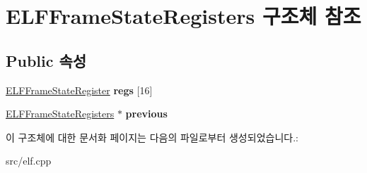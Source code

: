 \hypertarget{struct_e_l_f_frame_state_registers}{}\section{E\+L\+F\+Frame\+State\+Registers 구조체 참조}
\label{struct_e_l_f_frame_state_registers}
\subsection*{Public 속성}
\begin{DoxyCompactItemize}
\item 
\mbox{\label{struct_e_l_f_frame_state_registers_a0b3a4a2b86db2d98e9f0e05837bc7038}} 
\mbox{\hyperlink{struct_e_l_f_frame_state_register}{E\+L\+F\+Frame\+State\+Register}} {\bfseries regs} \mbox{[}16\mbox{]}
\item 
\mbox{\label{struct_e_l_f_frame_state_registers_ac15ca53b64834c92c4c43b2652a082ed}} 
\mbox{\hyperlink{struct_e_l_f_frame_state_registers}{E\+L\+F\+Frame\+State\+Registers}} $\ast$ {\bfseries previous}
\end{DoxyCompactItemize}


이 구조체에 대한 문서화 페이지는 다음의 파일로부터 생성되었습니다.\+:\begin{DoxyCompactItemize}
\item 
src/elf.\+cpp\end{DoxyCompactItemize}
